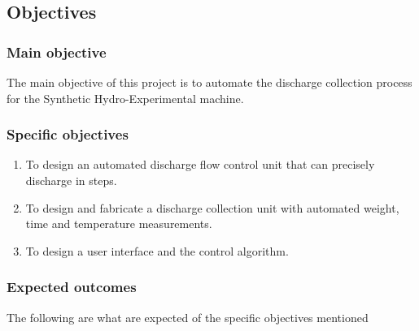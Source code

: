 \subsection{Objectives}
\subsubsection{Main objective}

The main objective of this project is to automate the discharge collection process for the Synthetic Hydro-Experimental machine. 

\subsubsection{Specific objectives}

\begin{enumerate}
	\item To design an automated discharge flow control unit that can precisely discharge in steps.
	\item To design and fabricate a discharge collection unit with automated weight, time and temperature measurements.
    \item To design a user interface and the control algorithm.

\end{enumerate}

\subsubsection{Expected outcomes}
The following are what are expected of the specific objectives mentioned

